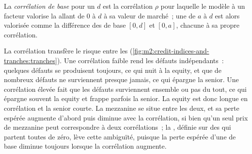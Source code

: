 \begin{definition}\label{def:m2:credit-indices-and-tranches:basecorr}
La \emph{corrélation de base} pour un  $d$ est la
corrélation $\rho$ pour laquelle le modèle à un facteur valorise la  allant de 0 à $d$ à
sa valeur de marché~; une  de $a$ à $d$ est alors valorisée comme la différence des
 de base $[0,d]$ et $[0,a]$, chacune à sa propre corrélation.
\end{definition}

La corrélation transfère le risque entre les 
(\cref{fig:m2:credit-indices-and-tranches:tranches}). Une corrélation faible rend les défauts
indépendants~: quelques défauts se produisent toujours, ce qui nuit à la  equity, et que de nombreux défauts ne surviennent presque jamais, ce qui
épargne la  senior. Une corrélation élevée fait que les défauts surviennent ensemble ou pas du tout, ce qui
épargne souvent la  equity et frappe parfois la  senior. La  equity est donc longue
en corrélation et la  senior courte. La mezzanine se situe entre les deux, et sa perte espérée
augmente d'abord puis diminue avec la corrélation, si bien qu'un seul prix de mezzanine peut correspondre à deux
corrélations~; la , définie sur des  qui partent toutes de zéro, lève
cette ambiguïté, puisque la perte espérée d'une  de base diminue toujours lorsque la corrélation augmente.

